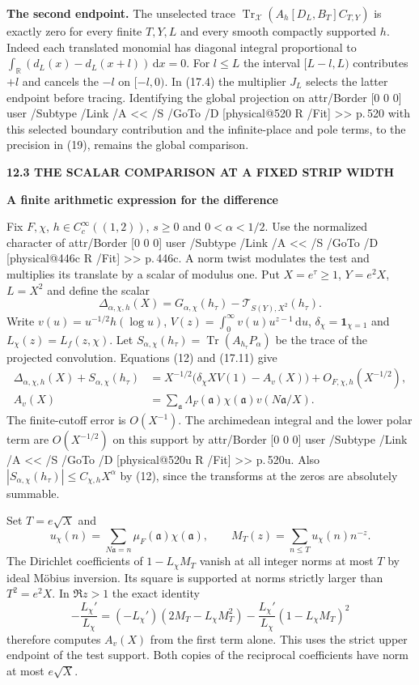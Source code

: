 \documentclass[11pt,letterpaper]{article}
\makeatletter
\newcommand{\rightmarktext}{}
\newcommand{\printfolio}{}
\newcommand{\leaf}[4]{\clearpage\gdef\printfolio{#1}\gdef\rightmarktext{#2}%
  {\small\sffamily\bfseries\color{ink}#3\par}\vspace{3pt}%
  {\LARGE\bfseries #4\par}\vspace{5pt}}
\newcommand{\point}[1]{\par\smallskip\textbf{#1.}\enspace\ignorespaces}
\newcommand{\R}{\mathbb R}
\newcommand{\dd}{\,\mathrm d}
\DeclareMathOperator{\Tr}{Tr}
\newcommand{\MusicPDFPageRef}[1]{\pdfpageref\csname physical@#1\endcsname\space\space 0 R}
\newcommand{\pagelink}[2]{\leavevmode\pdfstartlink attr{/Border [0 0 0]} user{%
  /Subtype /Link /A << /S /GoTo /D [\MusicPDFPageRef{#1} /Fit] >>}%
  {\color{ink}#2}\pdfendlink}
\newcommand{\pg}[1]{\pagelink{#1}{p.\,#1}}
\makeatother
\begin{document}
\point{The second endpoint}
The unselected trace $\Tr_{\mathcal X}(A_h[D_L,B_T]C_{T,Y})$ is exactly zero
for every finite $T,Y,L$ and every smooth compactly supported $h$.
Indeed each translated monomial has diagonal integral proportional to
$\int_{\R}(d_L(x)-d_L(x+l))\dd x=0$.
For $l\le L$ the interval $[L-l,L)$ contributes $+l$ and cancels the
$-l$ on $[-l,0)$. In (17.4) the multiplier $J_L$ selects the latter
endpoint before tracing. Identifying the global projection on \pg{520}
with this selected boundary contribution and the infinite-place and pole
terms, to the precision in (19), remains the global comparison.

\leaf{514f}{The global and finite traces}{12.3 \quad THE SCALAR COMPARISON AT A FIXED STRIP WIDTH}{A finite arithmetic expression for the difference}
Fix $F,\chi$, $h\in C_c^\infty((1,2))$, $s\ge0$ and $0<\alpha<1/2$.
Use the normalized character of \pg{446c}. A norm twist modulates the
test and multiplies its translate by a scalar of modulus one. Put
$X=e^\tau\ge1$, $Y=e^2X$, $L=X^2$ and define the scalar
\[
 \Delta_{\alpha,\chi,h}(X)=G_{\alpha,\chi}(h_\tau)
                       -\mathcal T_{S(Y),X^2}(h_\tau).
\]
Write $v(u)=u^{-1/2}h(\log u)$, $V(z)=\int_0^\infty v(u)u^{z-1}\dd u$,
$\delta_\chi=\mathbf1_{\chi=1}$ and $L_\chi(z)=L_f(z,\chi)$.
Let $S_{\alpha,\chi}(h_\tau)=\Tr(A_{h_\tau}P_\alpha)$ be the trace
of the projected convolution. Equations (12) and (17.11) give
\begin{align*}
 \Delta_{\alpha,\chi,h}(X)+S_{\alpha,\chi}(h_\tau)
  &=X^{-1/2}\big(\delta_\chi XV(1)-A_v(X)\big)+O_{F,\chi,h}(X^{-1/2}),\\
 A_v(X)&=\sum_{\mathfrak a}\Lambda_F(\mathfrak a)\chi(\mathfrak a)
                       v(N\mathfrak a/X).
 \tag{17.4a}
\end{align*}
The finite-cutoff error is $O(X^{-1})$. The archimedean integral
and the lower polar term are $O(X^{-1/2})$ on this support by
\pg{520u}. Also $|S_{\alpha,\chi}(h_\tau)|\le C_{\chi,h}X^\alpha$
by (12), since the transforms at the zeros are absolutely summable.

Set $T=e\sqrt X$ and
\[
 u_\chi(n)=\sum_{N\mathfrak a=n}\mu_F(\mathfrak a)\chi(\mathfrak a),
 \qquad M_T(z)=\sum_{n\le T}u_\chi(n)n^{-z}.
\]
The Dirichlet coefficients of $1-L_\chi M_T$ vanish at all integer
norms at most $T$ by ideal M\"obius inversion. Its square is supported
at norms strictly larger than $T^2=e^2X$. In $\Re z>1$ the exact identity
\[
 -\frac{L_\chi'}{L_\chi}
    =(-L_\chi')(2M_T-L_\chi M_T^2)
       -\frac{L_\chi'}{L_\chi}(1-L_\chi M_T)^2
\]
therefore computes $A_v(X)$ from the first term alone. This uses the
strict upper endpoint of the test support. Both copies of the
reciprocal coefficients have norm at most $e\sqrt X$.
\end{document}
